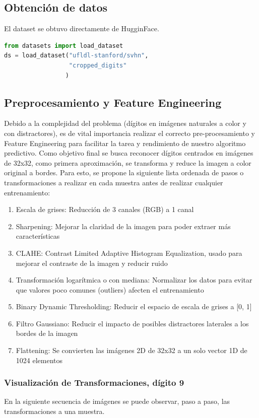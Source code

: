 \documentclass[journal]{IEEEtran}
\begin{document}
\subsection{Obtención de datos}
El dataset se obtuvo directamente de HugginFace.\cite{huggingface_svhn}
\begin{lstlisting}[language=Python]
from datasets import load_dataset
ds = load_dataset("ufldl-stanford/svhn",
                  "cropped_digits"
                 )
\end{lstlisting}


\subsection{Preprocesamiento y Feature Engineering}
Debido a la complejidad del problema (dígitos en imágenes naturales a color y con distractores), es de vital importancia realizar el correcto pre-procesamiento y Feature Engineering para facilitar la tarea y rendimiento de nuestro algoritmo predictivo. Como objetivo final se busca reconocer dígitos centrados en imágenes de 32x32, como primera aproximación, se transforma y reduce la imagen a color original a bordes. Para esto, se propone la siguiente lista ordenada de pasos o transformaciones a realizar en cada muestra antes de realizar cualquier entrenamiento:

\begin{enumerate}
        \item Escala de grises: Reducción de 3 canales (RGB) a 1 canal
        \item Sharpening: Mejorar la claridad de la imagen para poder extraer más características
        \item CLAHE: Contrast Limited Adaptive Histogram Equalization, usado para mejorar el contraste de la imagen y reducir ruido
        \item Transformación logarítmica o con mediana: Normalizar los datos para evitar que valores poco comunes (outliers) afecten el entrenamiento
        \item Binary Dynamic Thresholding: Reducir el espacio de escala de grises a [0, 1]
        \item Filtro Gaussiano: Reducir el impacto de posibles distractores laterales a los bordes de la imagen
        \item Flattening: Se convierten las imágenes 2D de 32x32 a un solo vector 1D de 1024 elementos
\end{enumerate}

\subsubsection{Visualización de Transformaciones, dígito 9}
En la siguiente secuencia de imágenes se puede observar, paso a paso, las transformaciones a una muestra.
\end{document}
